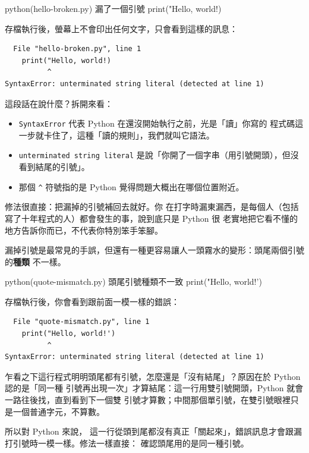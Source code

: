 \begin{example}{python}{(hello-broken.py) 漏了一個引號}
print("Hello, world!)
\end{example}

存檔執行後，螢幕上不會印出任何文字，只會看到這樣的訊息：

\begin{verbatim}
  File "hello-broken.py", line 1
    print("Hello, world!)
          ^
SyntaxError: unterminated string literal (detected at line 1)
\end{verbatim}

這段話在說什麼？拆開來看：

\begin{itemize}
\item \texttt{SyntaxError} 代表 Python 在還沒開始執行之前，光是「讀」你寫的
程式碼這一步就卡住了，這種「讀的規則」，我們就叫它語法。
\item \texttt{unterminated string
literal} 是說「你開了一個字串（用引號開頭），但沒看到結尾的引號」。
\item 那個 \texttt{\^{}}
符號指的是 Python 覺得問題大概出在哪個位置附近。
\end{itemize}

修法很直接：把漏掉的引號補回去就好。你
在打字時漏東漏西，是每個人（包括寫了十年程式的人）都會發生的事，說到底只是 Python 很
老實地把它看不懂的地方告訴你而已，不代表你特別笨手笨腳。

漏掉引號是最常見的手誤，但還有一種更容易讓人一頭霧水的變形：頭尾兩個引號的\textbf{種類}
不一樣。

\begin{example}{python}{(quote-mismatch.py) 頭尾引號種類不一致}
print("Hello, world!')
\end{example}

存檔執行後，你會看到跟前面一模一樣的錯誤：

\begin{verbatim}
  File "quote-mismatch.py", line 1
    print("Hello, world!')
          ^
SyntaxError: unterminated string literal (detected at line 1)
\end{verbatim}

乍看之下這行程式明明頭尾都有引號，怎麼還是「沒有結尾」？原因在於 Python 認的是「同一種
引號再出現一次」才算結尾：這一行用雙引號開頭，Python 就會一路往後找，直到看到下一個雙
引號才算數；中間那個單引號，在雙引號眼裡只是一個普通字元，不算數。

所以對 Python 來說，
這一行從頭到尾都沒有真正「關起來」，錯誤訊息才會跟漏打引號時一模一樣。修法一樣直接：
確認頭尾用的是同一種引號。

